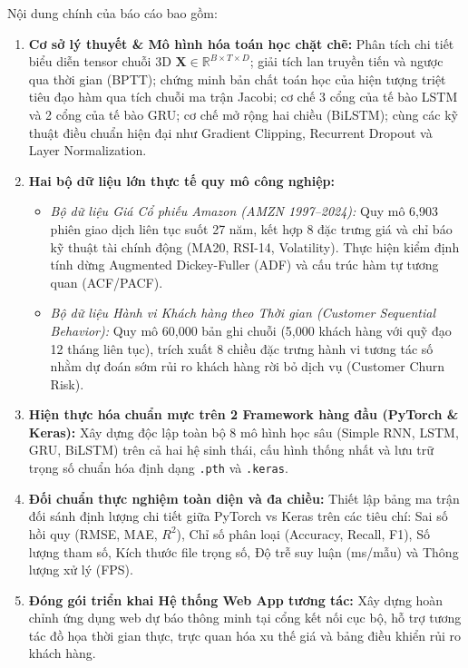 \documentclass[12pt,a4paper]{report}
\begin{document}
Nội dung chính của báo cáo bao gồm:
\begin{enumerate}[leftmargin=1.5cm]
    \item \textbf{Cơ sở lý thuyết \& Mô hình hóa toán học chặt chẽ:} Phân tích chi tiết biểu diễn tensor chuỗi 3D $\mathbf{X} \in \mathbb{R}^{B \times T \times D}$; giải tích lan truyền tiến và ngược qua thời gian (BPTT); chứng minh bản chất toán học của hiện tượng triệt tiêu đạo hàm qua tích chuỗi ma trận Jacobi; cơ chế 3 cổng của tế bào LSTM và 2 cổng của tế bào GRU; cơ chế mở rộng hai chiều (BiLSTM); cùng các kỹ thuật điều chuẩn hiện đại như Gradient Clipping, Recurrent Dropout và Layer Normalization.
    \item \textbf{Hai bộ dữ liệu lớn thực tế quy mô công nghiệp:}
    \begin{itemize}
        \item \textit{Bộ dữ liệu Giá Cổ phiếu Amazon (AMZN 1997--2024):} Quy mô 6,903 phiên giao dịch liên tục suốt 27 năm, kết hợp 8 đặc trưng giá và chỉ báo kỹ thuật tài chính động (MA20, RSI-14, Volatility). Thực hiện kiểm định tính dừng Augmented Dickey-Fuller (ADF) và cấu trúc hàm tự tương quan (ACF/PACF).
        \item \textit{Bộ dữ liệu Hành vi Khách hàng theo Thời gian (Customer Sequential Behavior):} Quy mô 60,000 bản ghi chuỗi (5,000 khách hàng với quỹ đạo 12 tháng liên tục), trích xuất 8 chiều đặc trưng hành vi tương tác số nhằm dự đoán sớm rủi ro khách hàng rời bỏ dịch vụ (Customer Churn Risk).
    \end{itemize}
    \item \textbf{Hiện thực hóa chuẩn mực trên 2 Framework hàng đầu (PyTorch \& Keras):} Xây dựng độc lập toàn bộ 8 mô hình học sâu (Simple RNN, LSTM, GRU, BiLSTM) trên cả hai hệ sinh thái, cấu hình thống nhất và lưu trữ trọng số chuẩn hóa định dạng \texttt{.pth} và \texttt{.keras}.
    \item \textbf{Đối chuẩn thực nghiệm toàn diện và đa chiều:} Thiết lập bảng ma trận đối sánh định lượng chi tiết giữa PyTorch vs Keras trên các tiêu chí: Sai số hồi quy (RMSE, MAE, $R^2$), Chỉ số phân loại (Accuracy, Recall, F1), Số lượng tham số, Kích thước file trọng số, Độ trễ suy luận (ms/mẫu) và Thông lượng xử lý (FPS).
    \item \textbf{Đóng gói triển khai Hệ thống Web App tương tác:} Xây dựng hoàn chỉnh ứng dụng web dự báo thông minh tại cổng kết nối cục bộ, hỗ trợ tương tác đồ họa thời gian thực, trực quan hóa xu thế giá và bảng điều khiển rủi ro khách hàng.
\end{enumerate}
\end{document}
